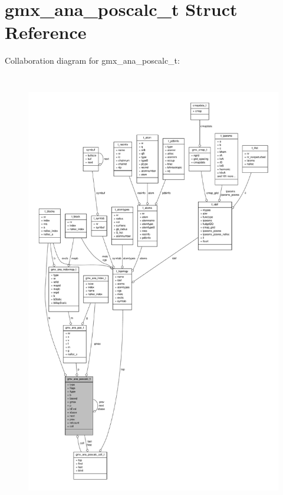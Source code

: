 \hypertarget{structgmx__ana__poscalc__t}{\section{gmx\-\_\-ana\-\_\-poscalc\-\_\-t \-Struct \-Reference}
\label{structgmx__ana__poscalc__t}
}


\-Collaboration diagram for gmx\-\_\-ana\-\_\-poscalc\-\_\-t\-:
\nopagebreak
\begin{figure}[H]
\begin{center}
\leavevmode
\includegraphics[height=550pt]{structgmx__ana__poscalc__t__coll__graph}
\end{center}
\end{figure}

